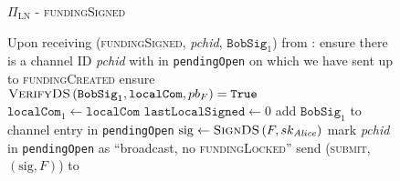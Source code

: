   \begin{figure}[H]
    \begin{protocolbox}{$\Pi_{\mathrm{LN}}$ - \textsc{fundingSigned}}
      \begin{algorithmic}[1]
        \State Upon receiving (\textsc{fundingSigned}, \textit{pchid},
        $\mathtt{BobSig}_1$) from \bob:
        \Indent
          \State ensure there is a channel ID \textit{pchid} with \bob{} in
          \texttt{pendingOpen} on which we have sent up to
          \textsc{fundingCreated}
          \State ensure $\textsc{VerifyDS}\left(\mathtt{BobSig}_1,
          \mathtt{localCom}, pb_F\right) = \mathtt{True}$
          \State $\mathtt{localCom}_1 \gets \mathtt{localCom}$
          \State $\mathtt{lastLocalSigned} \gets 0$
          \State add $\mathtt{BobSig}_1$ to channel entry in
          \texttt{pendingOpen}
          \State $\mathrm{sig} \gets \textsc{SignDS}\left(F,
          sk_{\mathit{Alice}}\right)$
          \State mark \textit{pchid} in \texttt{pendingOpen} as ``broadcast, no
          \textsc{fundingLocked}''
          \label{alg:protocol:open:fundingSigned:mark}
          \State send (\textsc{submit}, $\left(\mathrm{sig}, F\right)$) to
          \ledger
        \EndIndent
      \end{algorithmic}
    \end{protocolbox}
    \caption{}
    \label{alg:protocol:open:fundingSigned}
  \end{figure}

